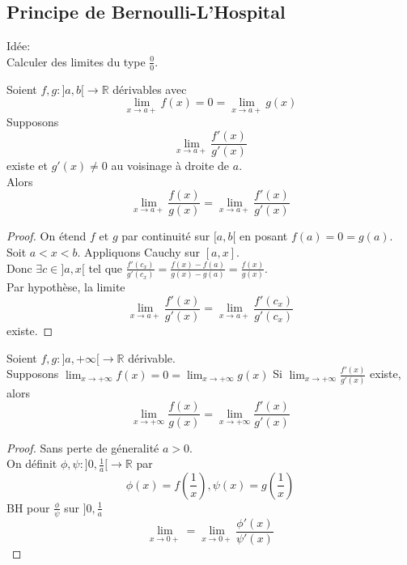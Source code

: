 \documentclass[../main.tex]{subfiles}
\begin{document}
\subsection{Principe de Bernoulli-L'Hospital}
Idée:\\
Calculer des limites du type $\frac{0}{0}$.
\begin{thm}
	Soient $f,g: ]a,b[ \to \mathbb{R}$ dérivables avec
	\[ 
		\lim_{x \to a +} f( x) = 0 = \lim_{x \to a+} g( x) 
	\]
	Supposons 
	\[ 
		\lim_{x \to a+} \frac{f'( x) }{g'( x) }	
	\]
	existe et $g'( x) \neq 0$ au voisinage à droite de $a$.\\
	Alors
	\[ 
		\lim_{x \to a+} \frac{f( x) }{g( x) }= \lim_{x \to a+} \frac{f'( x) }{g'( x) }
	\]
	
	

\end{thm}
\begin{proof}
	On étend $f$ et $g$ par continuité sur $[a,b[$ en posant $f( a) = 0 =g( a) $.\\
	Soit $a<x<b$. Appliquons Cauchy sur  $[a,x]$.\\
	Donc $\exists c \in ]a,x[$ tel que $\frac{f'( c_x) }{g'( c_x) }= \frac{f( x) - f( a) }{g( x) - g( a) } = \frac{f( x) }{g( x) } $.\\
	Par hypothèse, la limite
	\[ 
		\lim_{x \to a+} \frac{f'( x) }{g'( x) }= \lim_{x \to a+} \frac{f'( c_x) }{g'( c_x) }
	\]
	existe.
\end{proof}
\begin{thm}
	Soient $f,g: ]a,+ \infty [ \to \mathbb{R} $ dérivable.\\
	Supposons $\lim_{x \to  + \infty} f( x) = 0 = \lim_{x \to  + \infty} g( x)  $
	Si $ \lim_{x \to  + \infty} \frac{f'( x) }{g'( x) }$ existe, alors
	\[ 
		\lim_{x \to  + \infty} \frac{f( x) }{g( x) }= \lim_{x \to  + \infty} \frac{f'( x) }{g'( x) }
	\]
	
	
	
\end{thm}

\begin{proof}
Sans perte de géneralité $a>0$. \\
On définit $\phi, \psi: ]0,\frac{1}{a}[ \to \mathbb{R}$ par 
\[ 
	\phi( x) = f( \frac{1}{x}), \psi( x) = g( \frac{1}{x}) 
\]
BH pour $\frac{\phi}{\psi}$ sur $]0,\frac{1}{a}$ 
\[ 
	\lim_{x \to 0+} = \lim_{x \to 0+} \frac{\phi'( x) }{\psi'( x) }
\]



\end{proof}
\end{document}
